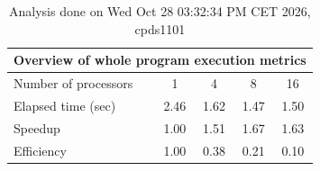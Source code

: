 \begin{table}[h]
\begin{center}
\begin{tabular}{|l|c|c|c|c|}
\hline
\multicolumn{5}{|c|}{Overview of whole program execution metrics} \\
\hline
\hline
Number of processors & 1 & 4 & 8 & 16 \\
\hline
Elapsed time (sec)      &       2.46 &       1.62 &       1.47 &       1.50 \\
\hline
Speedup                 &       1.00 &       1.51 &       1.67 &       1.63 \\
\hline
Efficiency              &       1.00 &       0.38 &       0.21 &       0.10 \\
\hline
\end{tabular}
\end{center}
\caption{ Analysis done on Wed Oct 28 03:32:34 PM CET 2026, cpds1101}
\end{table}
